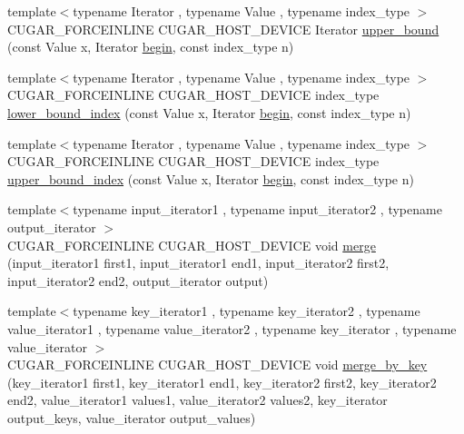 \begin{DoxyCompactItemize}
\item 
{\footnotesize template$<$typename Iterator , typename Value , typename index\+\_\+type $>$ }\\C\+U\+G\+A\+R\+\_\+\+F\+O\+R\+C\+E\+I\+N\+L\+I\+NE C\+U\+G\+A\+R\+\_\+\+H\+O\+S\+T\+\_\+\+D\+E\+V\+I\+CE Iterator \hyperlink{group___algorithms_module_gafe7ee3a93350b3d2f7f7bb6266ee0425}{upper\+\_\+bound} (const Value x, Iterator \hyperlink{namespacecugar_a2121df08f967e232ea5fe0ee378dee67}{begin}, const index\+\_\+type n)
\item 
{\footnotesize template$<$typename Iterator , typename Value , typename index\+\_\+type $>$ }\\C\+U\+G\+A\+R\+\_\+\+F\+O\+R\+C\+E\+I\+N\+L\+I\+NE C\+U\+G\+A\+R\+\_\+\+H\+O\+S\+T\+\_\+\+D\+E\+V\+I\+CE index\+\_\+type \hyperlink{group___algorithms_module_ga43d4b89e44476e26c04a89f975e4a21e}{lower\+\_\+bound\+\_\+index} (const Value x, Iterator \hyperlink{namespacecugar_a2121df08f967e232ea5fe0ee378dee67}{begin}, const index\+\_\+type n)
\item 
{\footnotesize template$<$typename Iterator , typename Value , typename index\+\_\+type $>$ }\\C\+U\+G\+A\+R\+\_\+\+F\+O\+R\+C\+E\+I\+N\+L\+I\+NE C\+U\+G\+A\+R\+\_\+\+H\+O\+S\+T\+\_\+\+D\+E\+V\+I\+CE index\+\_\+type \hyperlink{group___algorithms_module_ga8f544d88f3f11cd945933bfa50626375}{upper\+\_\+bound\+\_\+index} (const Value x, Iterator \hyperlink{namespacecugar_a2121df08f967e232ea5fe0ee378dee67}{begin}, const index\+\_\+type n)
\item 
{\footnotesize template$<$typename input\+\_\+iterator1 , typename input\+\_\+iterator2 , typename output\+\_\+iterator $>$ }\\C\+U\+G\+A\+R\+\_\+\+F\+O\+R\+C\+E\+I\+N\+L\+I\+NE C\+U\+G\+A\+R\+\_\+\+H\+O\+S\+T\+\_\+\+D\+E\+V\+I\+CE void \hyperlink{group___algorithms_module_gae6ef81c9ca1cd3976caad12299e37452}{merge} (input\+\_\+iterator1 first1, input\+\_\+iterator1 end1, input\+\_\+iterator2 first2, input\+\_\+iterator2 end2, output\+\_\+iterator output)
\item 
{\footnotesize template$<$typename key\+\_\+iterator1 , typename key\+\_\+iterator2 , typename value\+\_\+iterator1 , typename value\+\_\+iterator2 , typename key\+\_\+iterator , typename value\+\_\+iterator $>$ }\\C\+U\+G\+A\+R\+\_\+\+F\+O\+R\+C\+E\+I\+N\+L\+I\+NE C\+U\+G\+A\+R\+\_\+\+H\+O\+S\+T\+\_\+\+D\+E\+V\+I\+CE void \hyperlink{group___algorithms_module_ga267a2752f3e81f521e759ec274b80561}{merge\+\_\+by\+\_\+key} (key\+\_\+iterator1 first1, key\+\_\+iterator1 end1, key\+\_\+iterator2 first2, key\+\_\+iterator2 end2, value\+\_\+iterator1 values1, value\+\_\+iterator2 values2, key\+\_\+iterator output\+\_\+keys, value\+\_\+iterator output\+\_\+values)

\end{DoxyCompactItemize}
